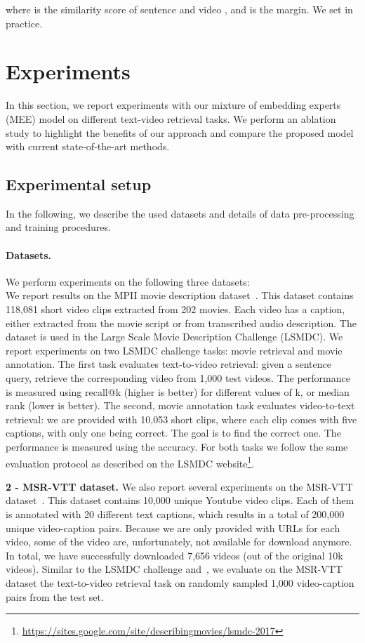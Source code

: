 \documentclass[runningheads]{llncs}
\begin{document}
where  is the similarity score of sentence  and video , and
  is the margin. We set  in practice.




\section{Experiments} \label{sec:exp}


In this section, we report experiments with our mixture of embedding experts (MEE) model on different text-video retrieval tasks. We perform an ablation study to highlight the benefits of our approach and compare the proposed model with current state-of-the-art methods. 

\subsection{Experimental setup}
In the following, we describe the used datasets and details of data pre-processing and training procedures. 


\paragraph{Datasets.} We perform experiments on the following three datasets:\\
{}
We report results on the MPII movie description dataset~\cite{rohrbach15dataset}. This dataset contains 118,081 short video clips extracted from 202 movies. Each video has a caption, either extracted from the movie script or from transcribed audio description. The dataset is used in the Large Scale Movie Description Challenge (LSMDC). We report experiments on two LSMDC challenge tasks: movie retrieval and movie annotation. The first task evaluates text-to-video retrieval: given a sentence query, retrieve the corresponding video from 1,000 test videos. The performance is measured using recall@k (higher is better) for different values of k, or median rank (lower is better).   
The second, movie annotation task evaluates video-to-text retrieval: we are provided with 10,053 short clips, where each clip comes with five captions, with only one being correct. The goal is to find the correct one. The performance is measured using the accuracy. For both tasks we follow the same evaluation protocol as described on the LSMDC website\footnote{\url{https://sites.google.com/site/describingmovies/lsmdc-2017}}.

{\noindent \bf{2 - MSR-VTT dataset.}}
We also report several experiments on the MSR-VTT dataset~\cite{xu16msrvtt}. This dataset contains 10,000 unique Youtube video clips. Each of them is annotated with 20 different text captions, which results in a total of 200,000 unique video-caption pairs. Because we are only provided with URLs for each video, some of the video are, unfortunately, not available for download anymore. In total, we have successfully downloaded 7,656 videos (out of the original 10k videos). Similar to the LSMDC challenge and~\cite{rohrbach15dataset}, we evaluate on the MSR-VTT dataset the text-to-video retrieval task on randomly sampled 1,000 video-caption pairs from the test set. 
\end{document}
